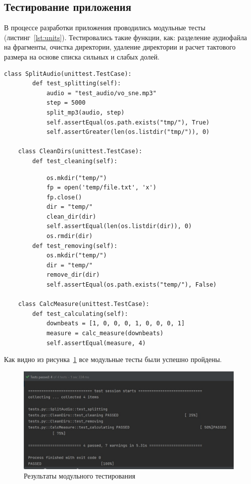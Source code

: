 \newpage

\subsection{Тестирование приложения}

В процессе разработки приложения проводились модульные тесты (листинг~\ref{lst:units}). Тестировались такие функции, как: разделение аудиофайла на фрагменты, очистка директории, удаление директории и расчет тактового размера на основе списка сильных и слабых долей.

\begin{lstlisting}[label={lst:units}, caption={модульные тесты}]
	class SplitAudio(unittest.TestCase):
		def test_splitting(self):
			audio = "test_audio/vo_sne.mp3"
			step = 5000
			split_mp3(audio, step)
			self.assertEqual(os.path.exists("tmp/"), True)
			self.assertGreater(len(os.listdir("tmp/")), 0)
	
	class CleanDirs(unittest.TestCase):
		def test_cleaning(self):
\end{lstlisting}

\begin{lstlisting}
			os.mkdir("temp/")
			fp = open('temp/file.txt', 'x')
			fp.close()
			dir = "temp/"
			clean_dir(dir)
			self.assertEqual(len(os.listdir(dir)), 0)
			os.rmdir(dir)
		def test_removing(self):
			os.mkdir("temp/")
			dir = "temp/"
			remove_dir(dir)
			self.assertEqual(os.path.exists("temp/"), False)
	
	class CalcMeasure(unittest.TestCase):
		def test_calculating(self):
			downbeats = [1, 0, 0, 0, 1, 0, 0, 0, 1]
			measure = calc_measure(downbeats)
			self.assertEqual(measure, 4)
\end{lstlisting}

Как видно из рисунка~\ref{img:units} все модульные тесты были успешно пройдены.

\begin{figure}[h]
	\centering
	\includegraphics[scale=0.8]{inc/img/units.jpg}
	\caption{Результаты модульного тестирования}
	\label{img:units}
\end{figure}

